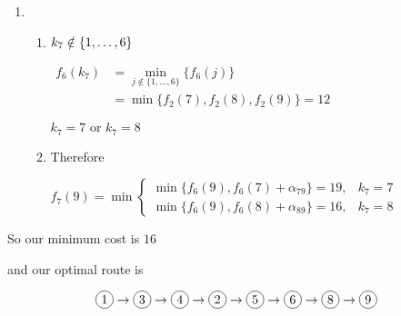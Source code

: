 \begin{prob}
\begin{sol}
\begin{enumerate}[label = {$\underline{i =\arabic*:}$}]
    \item \hspace{0.1cm} \\
    \begin{enumerate}[start = 1, label = {\protect\trc{$\mathbf{S_{\arabic*}}$}}]
    \item $k_7\notin\left\{1,\dots,6\right\}$
    
    $\begin{aligned}
    f_6(k_7) &= \min\limits_{j\notin\{1,\dots,6\}}\{f_6(j)\} \\
             &= \min\{f_2(7),f_2(8),f_2(9)\}=12
    \end{aligned}$
    
    \imp $k_7=7 \text{ or } k_7=8$ 
    
    \item Therefore
    
    $f_7(9) =\min
    \begin{cases}
    \min\{f_6(9), f_6(7) + \alpha_{79}\}=19, & k_7=7 \\
    \min\{f_6(9), f_6(8) + \alpha_{89}\}=16, & k_7=8 
    \end{cases}$
    
    \end{enumerate}
    
    \end{enumerate}
    
    So our minimum cost is $16$
    
    and our optimal route is
    
    $$\tc{1}\to\tc{3}\to\tc{4}\to\tc{2}\to\tc{5}\to\tc{6}\to\tc{8}\to\tc{9}$$
    \end{sol}
\end{prob}

